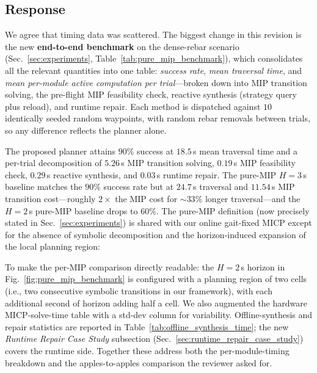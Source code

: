 \subsection{Response}
We agree that timing data was scattered. The biggest change in this revision is the new \textbf{end-to-end benchmark} on the dense-rebar scenario (Sec.~\ref{sec:experiments}, Table~\ref{tab:pure_mip_benchmark}), which consolidates all the relevant quantities into one table: \emph{success rate}, \emph{mean traversal time}, and \emph{mean per-module active computation per trial}---broken down into MIP transition solving, the pre-flight MIP feasibility check, reactive synthesis (strategy query plus reload), and runtime repair. Each method is dispatched against $10$ identically seeded random waypoints, with random rebar removals between trials, so any difference reflects the planner alone.

\noindent The proposed planner attains $90\%$ success at $18.5$\,s mean traversal time and a per-trial decomposition of $5.26$\,s MIP transition solving, $0.19$\,s MIP feasibility check, $0.29$\,s reactive synthesis, and $0.03$\,s runtime repair. The pure-MIP $H{=}3$\,s baseline matches the $90\%$ success rate but at $24.7$\,s traversal and $11.54$\,s MIP transition cost---roughly $2\times$ the MIP cost for $\sim 33\%$ longer traversal---and the $H{=}2$\,s pure-MIP baseline drops to $60\%$. The pure-MIP definition (now precisely stated in Sec.~\ref{sec:experiments}) is shared with our online gait-fixed MICP except for the absence of symbolic decomposition and the horizon-induced expansion of the local planning region:

\textit{}

To make the per-MIP comparison directly readable: the $H{=}2$\,s horizon in Fig.~\ref{fig:pure_mip_benchmark} is configured with a planning region of two cells (i.e., two consecutive symbolic transitions in our framework), with each additional second of horizon adding half a cell. We also augmented the hardware MICP-solve-time table with a std-dev column for variability. Offline-synthesis and repair statistics are reported in Table~\ref{tab:offline_synthesis_time}; the new \textit{Runtime Repair Case Study} subsection (Sec.~\ref{sec:runtime_repair_case_study}) covers the runtime side. Together these address both the per-module-timing breakdown and the apples-to-apples comparison the reviewer asked for.

